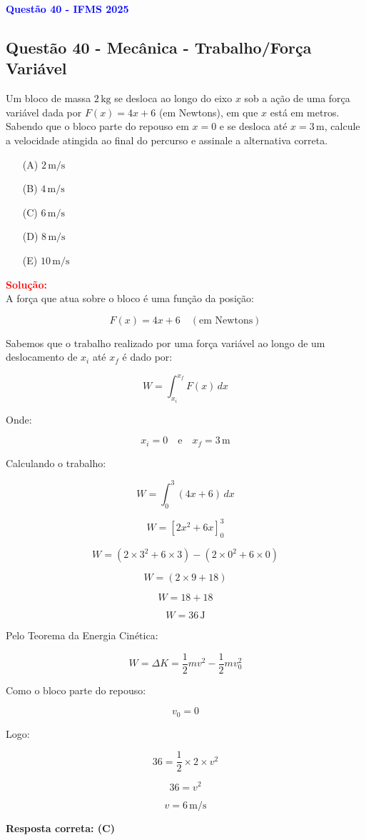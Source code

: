 \begin{flushleft}
\textbf{\textcolor{blue}{\Large Quest\~ao 40 - IFMS 2025}}\\
\subsection{Quest\~ao 40 - Mecânica - Trabalho/Força Vari\'avel}
Um bloco de massa $2\,\text{kg}$ se desloca ao longo do eixo $x$ sob a ação de uma força variável dada por 
$F(x) = 4x + 6$ (em Newtons), em que $x$ está em metros. Sabendo que o bloco parte do repouso em $x = 0$ e se 
desloca até $x = 3\,\text{m}$, calcule a velocidade atingida ao final do percurso e assinale a alternativa correta.

\begin{enumerate}
\item[(A)] $2\,\text{m/s}$
\item[(B)] $4\,\text{m/s}$
\item[(C)] $6\,\text{m/s}$
\item[(D)] $8\,\text{m/s}$
\item[(E)] $10\,\text{m/s}$
\end{enumerate}

\vspace{0.5cm}

\textcolor{red}{\textbf{Solução:}}\\

A força que atua sobre o bloco é uma função da posição:

\[
F(x) = 4x + 6 \quad (\text{em Newtons})
\]

Sabemos que o trabalho realizado por uma força variável ao longo de um deslocamento de $x_i$ até $x_f$ é dado por:

\[
W = \int_{x_i}^{x_f} F(x) \, dx
\]

Onde:

\[
x_i = 0 \quad \text{e} \quad x_f = 3\,\text{m}
\]

Calculando o trabalho:

\[
W = \int_{0}^{3} (4x + 6) \, dx
\]

\[
W = \left[ 2x^2 + 6x \right]_0^3
\]

\[
W = \left( 2 \times 3^2 + 6 \times 3 \right) - \left( 2 \times 0^2 + 6 \times 0 \right)
\]

\[
W = \left( 2 \times 9 + 18 \right)
\]

\[
W = 18 + 18
\]

\[
W = 36\,\text{J}
\]

Pelo Teorema da Energia Cinética:

\[
W = \Delta K = \frac{1}{2} m v^2 - \frac{1}{2} m v_0^2
\]

Como o bloco parte do repouso:

\[
v_0 = 0
\]

Logo:

\[
36 = \frac{1}{2} \times 2 \times v^2
\]

\[
36 = v^2
\]

\[
v = 6\,\text{m/s}
\]

\textbf{Resposta correta: \colorbox{green!50}{(C)}}

\end{flushleft}
